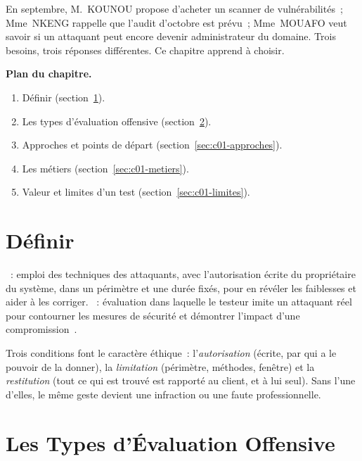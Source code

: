 En septembre, M.~KOUNOU propose d'acheter un scanner de vulnérabilités~;
Mme~NKENG rappelle que l'audit d'octobre est prévu~; Mme~MOUAFO veut savoir
si un attaquant peut encore devenir administrateur du domaine. Trois
besoins, trois réponses différentes. Ce chapitre apprend à choisir.

\medskip
\textbf{Plan du chapitre.}
\begin{enumerate}
    \item Définir (section~\ref{sec:c01-definir}).
    \item Les types d'évaluation offensive (section~\ref{sec:c01-types}).
    \item Approches et points de départ (section~\ref{sec:c01-approches}).
    \item Les métiers (section~\ref{sec:c01-metiers}).
    \item Valeur et limites d'un test (section~\ref{sec:c01-limites}).
\end{enumerate}

\separateur

\section{Définir}
\label{sec:c01-definir}

\begin{boxdef}
~: emploi des techniques des attaquants, avec
l'autorisation écrite du propriétaire du système, dans un périmètre et une
durée fixés, pour en révéler les faiblesses et aider à les corriger.
~: évaluation dans laquelle le testeur imite un
attaquant réel pour contourner les mesures de sécurité et démontrer
l'impact d'une compromission~\cite{nist800115}.
\end{boxdef}

Trois conditions font le caractère éthique~: l'\emph{autorisation} (écrite,
par qui a le pouvoir de la donner), la \emph{limitation} (périmètre,
méthodes, fenêtre) et la \emph{restitution} (tout ce qui est trouvé est
rapporté au client, et à lui seul). Sans l'une d'elles, le même geste devient
une infraction ou une faute professionnelle.

\section{Les Types d'Évaluation Offensive}
\label{sec:c01-types}

